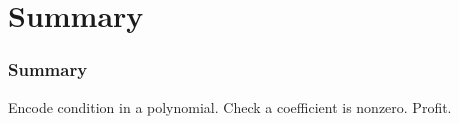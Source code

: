 \documentclass{beamer}
\theoremstyle{definition}
\begin{document}
\section{Summary}
\begin{frame}
  \frametitle{Summary}
  \begin{enumerate}
    \ii Encode condition in a polynomial.
    \ii Check a coefficient is nonzero.
    \ii Profit.
  \end{enumerate}
\end{frame}
\end{document}
